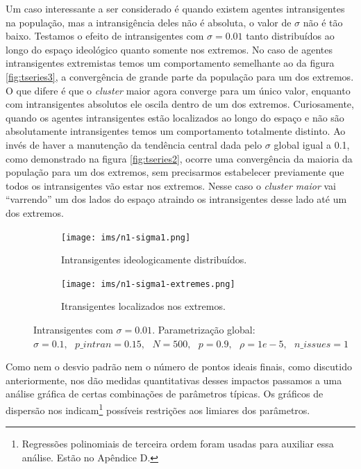  Um caso interessante a ser considerado é quando existem agentes intransigentes
  na população, mas a intransigência deles não é absoluta, o valor de \(\sigma\) não
  é tão baixo. Testamos o efeito de intransigentes com \(\sigma = 0.01\) tanto
  distribuídos ao longo do espaço ideológico quanto somente nos extremos. No
  caso de agentes intransigentes extremistas temos um comportamento semelhante
  ao da figura \ref{fig:tseries3}, a convergência de grande parte da população
  para um dos extremos. O que difere é que o \textit{cluster} maior agora
  converge para um único valor, enquanto com intransigentes absolutos ele oscila
  dentro de um dos extremos. Curiosamente, quando os agentes intransigentes
  estão localizados ao longo do espaço e não são absolutamente intransigentes
  temos um comportamento totalmente distinto. Ao invés de haver a manutenção da
  tendência central dada pelo \(\sigma\) global igual a 0.1, como demonstrado na
  figura \ref{fig:tseries2}, ocorre uma convergência da maioria da população
  para um dos extremos, sem precisarmos estabelecer previamente que todos os
  intransigentes vão estar nos extremos. Nesse caso o \textit{cluster maior} vai
  ``varrendo'' um dos lados do espaço atraindo os intransigentes desse lado até
  um dos extremos.

  \begin{figure}[H]
    \centering
    \begin{subfigure}[b]{0.49\textwidth}
      \texttt{[image: ims/n1-sigma1.png]}
      \caption{Intransigentes ideologicamente distribuídos.}
    \end{subfigure}
    \begin{subfigure}[b]{0.49\textwidth}
      \texttt{[image: ims/n1-sigma1-extremes.png]}
       \caption{Itransigentes localizados nos extremos.}
     \end{subfigure}

     \caption{ Intransigentes com \(\sigma = 0.01\). Parametrização global: \( \sigma =
       0.1, \text{ } p\_intran = 0.15, \text{ } N = 500, \text{ } p = 0.9,
       \text{ } \rho = 1e-5, \text{ } n\_issues = 1 \)}
    \label{fig:newintrans}
     \end{figure}
  

    Como nem o desvio padrão nem o número de pontos ideais finais,
    como discutido anteriormente, nos dão medidas quantitativas desses impactos
    passamos a uma análise gráfica de certas combinações de parâmetros típicas.
    Os gráficos de dispersão nos indicam\footnote{Regressões polinomiais de
      terceira ordem foram usadas para auxiliar essa análise. Estão no
      Apêndice D.} possíveis restrições aos limiares dos parâmetros.

